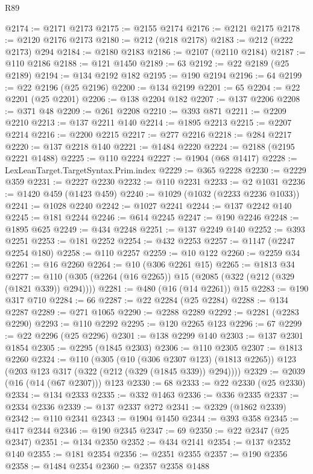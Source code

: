 \begin{lexlean}{R89}
\begin{coremodule}
@2174 := @2171 @2173
@2175 := @2155 @2174
@2176 := @2121 @2175
@2178 := @2120 @2176 @2173
@2180 := @212 (@218 @2178)
@2183 := @212 (@222 @2173) @294
@2184 := @2180 @2183
@2186 := @2107 (@2110 @2184)
@2187 := @110 @2186
@2188 := @121 @1450
@2189 := 63
@2192 := @22 @2189 (@25 @2189)
@2194 := @134 @2192 @182
@2195 := @190 @2194
@2196 := 64
@2199 := @22 @2196 (@25 @2196)
@2200 := @134 @2199
@2201 := 65
@2204 := @22 @2201 (@25 @2201)
@2206 := @138 @2204 @182
@2207 := @137 @2206
@2208 := @371 @48
@2209 := @261 @2208
@2210 := @393 @871
@2211 := @2209 @2210
@2213 := @137 @2211 @140
@2214 := @1895 @2213
@2215 := @2207 @2214
@2216 := @2200 @2215
@2217 := @277 @2216
@2218 := @284 @2217
@2220 := @137 @2218 @140
@2221 := @1484 @2220
@2224 := @2188 (@2195 @2221 @1488)
@2225 := @110 @2224
@2227 := @1904 (@68 @1417)
@2228 := LexLeanTarget.TargetSyntax.Prim.index
@2229 := @365 @2228
@2230 := @2229 @359
@2231 := @2227 @2230
@2232 := @110 @2231
@2233 := @2 @1031
@2236 := @1420 @459 (@1423 @459)
@2240 := @1029 (@1032 (@2233 @2236 @1033))
@2241 := @1028 @2240
@2242 := @1027 @2241
@2244 := @137 @2242 @140
@2245 := @181 @2244
@2246 := @614 @2245
@2247 := @190 @2246
@2248 := @1895 @625
@2249 := @434 @2248
@2251 := @137 @2249 @140
@2252 := @393 @2251
@2253 := @181 @2252
@2254 := @432 @2253
@2257 := @1147 (@2247 @2254 @180)
@2258 := @110 @2257
@2259 := @10 @122
@2260 := @2259 @34
@2261 := @16 @2260
@2264 := @10 (@306 @2261 @15)
@2265 := @1813 @34
@2277 := @110 (@305 (@2264 (@16 @2265)) @15 (@2085 (@322 (@212 (@329 (@1821 @339)) @294))))
@2281 := @480 (@16 (@14 @2261)) @15
@2283 := @190 @317 @710
@2284 := 66
@2287 := @22 @2284 (@25 @2284)
@2288 := @134 @2287
@2289 := @271 @1065
@2290 := @2288 @2289
@2292 := @2281 (@2283 @2290)
@2293 := @110 @2292
@2295 := @120 @2265 @123
@2296 := 67
@2299 := @22 @2296 (@25 @2296)
@2301 := @138 @2299 @140
@2303 := @137 @2301 @1854
@2305 := @2295 (@1845 @2303)
@2306 := @110 @2305
@2307 := @1813 @2260
@2324 := @110
    (@305
      (@10 (@306 @2307 @123) (@1813 @2265))
      @123
      (@203 @123 @317 (@322 (@212 (@329 (@1845 @339)) @294))))
@2329 := @2039 (@16 (@14 (@67 @2307))) @123
@2330 := 68
@2333 := @22 @2330 (@25 @2330)
@2334 := @134 @2333
@2335 := @332 @1463
@2336 := @336 @2335
@2337 := @2334 @2336
@2339 := @137 @2337 @272
@2341 := @2329 (@1862 @2339)
@2342 := @110 @2341
@2343 := @1904 @1450
@2344 := @393 @358
@2345 := @417 @2344
@2346 := @190 @2345
@2347 := 69
@2350 := @22 @2347 (@25 @2347)
@2351 := @134 @2350
@2352 := @434 @2141
@2354 := @137 @2352 @140
@2355 := @181 @2354
@2356 := @2351 @2355
@2357 := @190 @2356
@2358 := @1484 @2354
@2360 := @2357 @2358 @1488

\end{coremodule}
\end{lexlean}
